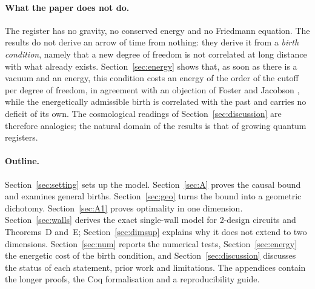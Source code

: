 \paragraph{What the paper does not do.} The register has no gravity, no conserved energy and no Friedmann equation. The results do not derive an arrow of time from nothing: they derive it from a \emph{birth condition}, namely that a new degree of freedom is not correlated at long distance with what already exists. Section~\ref{sec:energy} shows that, as soon as there is a vacuum and an energy, this condition costs an energy of the order of the cutoff per degree of freedom, in agreement with an objection of Foster and Jacobson \cite{FosterJacobson2004}, while the energetically admissible birth is correlated with the past and carries no deficit of its own. The cosmological readings of Section~\ref{sec:discussion} are therefore analogies; the natural domain of the results is that of growing quantum registers.

\paragraph{Outline.} Section~\ref{sec:setting} sets up the model. Section~\ref{sec:A} proves the causal bound and examines general births. Section~\ref{sec:geo} turns the bound into a geometric dichotomy. Section~\ref{sec:A1} proves optimality in one dimension. Section~\ref{sec:walls} derives the exact single-wall model for 2-design circuits and Theorems~D and~E; Section~\ref{sec:dimsup} explains why it does not extend to two dimensions. Section~\ref{sec:num} reports the numerical tests, Section~\ref{sec:energy} the energetic cost of the birth condition, and Section~\ref{sec:discussion} discusses the status of each statement, prior work and limitations. The appendices contain the longer proofs, the Coq formalisation and a reproducibility guide.
